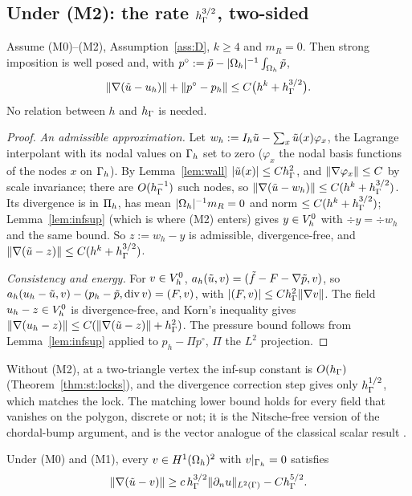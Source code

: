 \subsection{Under (M2): the rate \texorpdfstring{$h_\Gamma^{3/2}$}{h^(3/2)}, two-sided}

\begin{theorem}\label{thm:st:up}
Assume (M0)--(M2), Assumption~\ref{ass:D}, $k\ge4$ and $m_R=0$. Then strong imposition is well posed and, with $p^\circ:=\tilde p-|\Omega_h|^{-1}\int_{\Omega_h}\tilde p$,
\[
\lVert \nabla(\tilde u-u_h)\rVert+\lVert p^\circ-p_h\rVert\le C\bigl(h^k+h_\Gamma^{3/2}\bigr).
\]
No relation between $h$ and $h_\Gamma$ is needed.
\end{theorem}

\begin{proof}
\emph{An admissible approximation.} Let $w_h:=I_h\tilde u-\sum_x\tilde u(x)\varphi_x$, the Lagrange interpolant with its nodal values on $\Gamma_h$ set to zero ($\varphi_x$ the nodal basis functions of the nodes $x$ on $\Gamma_h$). By Lemma~\ref{lem:wall} $|\tilde u(x)|\le Ch_\Gamma^2$, and $\lVert \nabla\varphi_x\rVert\le C$ by scale invariance; there are $O(h_\Gamma^{-1})$ such nodes, so $\lVert \nabla(\tilde u-w_h)\rVert\le C(h^k+h_\Gamma^{3/2})$. Its divergence is in $\Pi_h$, has mean $|\Omega_h|^{-1}m_R=0$ and norm $\le C(h^k+h_\Gamma^{3/2})$; Lemma~\ref{lem:infsup} (which is where (M2) enters) gives $y\in V_h^0$ with $\div y=\div w_h$ and the same bound. So $z:=w_h-y$ is admissible, divergence-free, and $\lVert \nabla(\tilde u-z)\rVert\le C(h^k+h_\Gamma^{3/2})$.

\emph{Consistency and energy.} For $v\in V_h^0$, $a_h(\tilde u,v)=(\tilde f-F-\nabla\tilde p,v)$, so $a_h(u_h-\tilde u,v)-(p_h-\tilde p,\operatorname{div} v)=(F,v)$, with $|(F,v)|\le Ch_\Gamma^2\lVert \nabla v\rVert$. The field $u_h-z\in V_h^0$ is divergence-free, and Korn's inequality gives $\lVert \nabla(u_h-z)\rVert\le C(\lVert \nabla(\tilde u-z)\rVert+h_\Gamma^2)$. The pressure bound follows from Lemma~\ref{lem:infsup} applied to $p_h-\Pi p^\circ$, $\Pi$ the $L^2$ projection.
\end{proof}

Without (M2), at a two-triangle vertex the inf-sup constant is $O(h_\Gamma)$ (Theorem~\ref{thm:st:locks}), and the divergence correction step gives only $h_\Gamma^{1/2}$, which matches the lock. The matching lower bound holds for every field that vanishes on the polygon, discrete or not; it is the Nitsche-free version of the chordal-bump argument, and is the vector analogue of the classical scalar result \cite{BergerScottStrang1972,Scott1975}.

\begin{theorem}\label{thm:st:low}
Under (M0) and (M1), every $v\in H^1(\Omega_h)^2$ with $v|_{\Gamma_h}=0$ satisfies
\[
\lVert \nabla(\tilde u-v)\rVert\ge c\,h_\Gamma^{3/2}\lVert \partial_n u\rVert_{L^2(\Gamma)}-Ch_\Gamma^{5/2}.
\]
\end{theorem}

